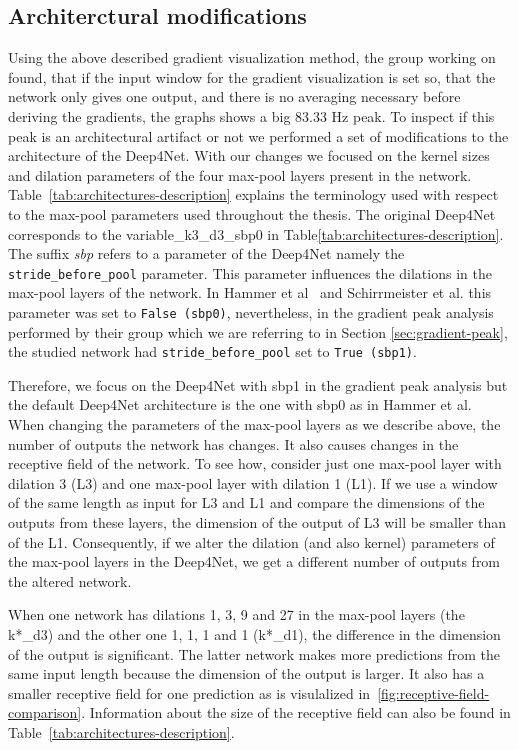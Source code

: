 \subsection{Architerctural modifications}
Using the above described gradient visualization method, the group working on~\cite{Hammer-2021} found, that if the input window for the gradient visualization is set so, that the network only gives one output, and there is no averaging necessary before deriving the gradients, the graphs shows a big 83.33 Hz peak.
To inspect if this peak is an architectural artifact or not we performed a set of modifications to the architecture of the Deep4Net.
With our changes we focused on the kernel sizes and dilation parameters of the four max-pool layers present in the network.
Table~\ref{tab:architectures-description} explains the terminology used with respect to the max-pool parameters used throughout the thesis.
The original Deep4Net corresponds to the {variable}\_k3\_d3\_sbp0 in Table\ref{tab:architectures-description}.
The suffix \textit{sbp} refers to a parameter of the Deep4Net namely the \texttt{stride\_before\_pool} parameter.
This parameter influences the dilations in the max-pool layers of the network. In Hammer et al~\cite{Hammer-2021} and Schirrmeister et al. \cite{schirrmeister-deep-2017}this parameter was set to \texttt{False (sbp0)}, nevertheless, in the gradient peak analysis performed by their group which we are referring to in Section \cref{sec:gradient-peak}, the studied network had \texttt{stride\_before\_pool} set to \texttt{True (sbp1)}.

Therefore, we focus on the Deep4Net with sbp1 in the gradient peak analysis but the default Deep4Net architecture is the one with sbp0 as in Hammer et al.
When changing the parameters of the max-pool layers as we describe above, the number of outputs the network has changes.
It also causes changes in the receptive field of the network.
To see how, consider just one max-pool layer with dilation 3 (L3) and one max-pool layer with dilation 1 (L1). If we use a window of the same length as input for L3 and L1 and compare the dimensions of the outputs from these layers, the dimension of the output of L3 will be smaller than of the L1.
Consequently, if we alter the dilation (and also kernel) parameters of the max-pool layers in the Deep4Net, we get a different number of outputs from the altered network. 

When one network has dilations 1, 3, 9 and 27 in the max-pool layers (the k*\_d3) and the other one 1, 1, 1 and 1 (k*\_d1), the difference in the dimension of the output is significant.
The latter network makes more predictions from the same input length because the dimension of the output is larger.
It also has a smaller receptive field for one prediction as is visulalized in~\cref{fig:receptive-field-comparison}.
Information about the size of the receptive field can also be found in Table~\ref{tab:architectures-description}.


